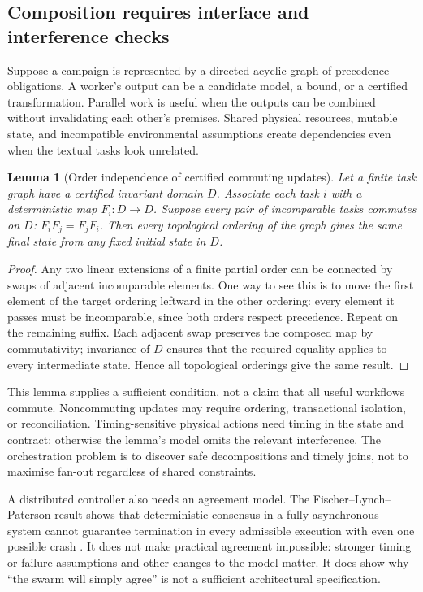 \documentclass[11pt,a4paper]{article}
\newtheorem{lemma}[theorem]{Lemma}
\theoremstyle{definition}
\theoremstyle{remark}
\begin{document}
\subsection{Composition requires interface and interference checks}
Suppose a campaign is represented by a directed acyclic graph of precedence obligations. A worker's output can be a candidate model, a bound, or a certified transformation. Parallel work is useful when the outputs can be combined without invalidating each other's premises. Shared physical resources, mutable state, and incompatible environmental assumptions create dependencies even when the textual tasks look unrelated.

\begin{lemma}[Order independence of certified commuting updates]\label{lem:commute}
Let a finite task graph have a certified invariant domain $D$. Associate each task $i$ with a deterministic map $F_i:D\to D$. Suppose every pair of incomparable tasks commutes on $D$: $F_iF_j=F_jF_i$. Then every topological ordering of the graph gives the same final state from any fixed initial state in $D$.
\end{lemma}
\begin{proof}
Any two linear extensions of a finite partial order can be connected by swaps of adjacent incomparable elements. One way to see this is to move the first element of the target ordering leftward in the other ordering: every element it passes must be incomparable, since both orders respect precedence. Repeat on the remaining suffix. Each adjacent swap preserves the composed map by commutativity; invariance of $D$ ensures that the required equality applies to every intermediate state. Hence all topological orderings give the same result.
\end{proof}
This lemma supplies a sufficient condition, not a claim that all useful workflows commute. Noncommuting updates may require ordering, transactional isolation, or reconciliation. Timing-sensitive physical actions need timing in the state and contract; otherwise the lemma's model omits the relevant interference. The orchestration problem is to discover safe decompositions and timely joins, not to maximise fan-out regardless of shared constraints.

A distributed controller also needs an agreement model. The Fischer--Lynch--Paterson result shows that deterministic consensus in a fully asynchronous system cannot guarantee termination in every admissible execution with even one possible crash \citep{flp}. It does not make practical agreement impossible: stronger timing or failure assumptions and other changes to the model matter. It does show why ``the swarm will simply agree'' is not a sufficient architectural specification.
\end{document}
